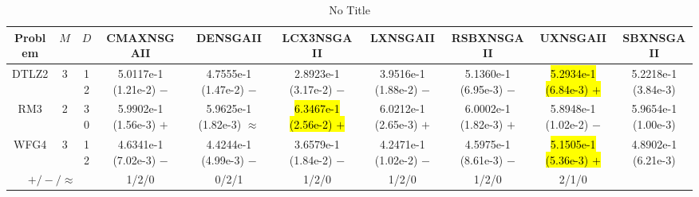 \documentclass[journal]{IEEEtran}
\begin{document}
\begin{table*}[htbp]
\renewcommand{\arraystretch}{1.2}
\centering
\caption{No Title}
\begin{tabular}{cccccccccc}
\toprule
Problem&$M$&$D$&CMAXNSGAII&DENSGAII&LCX3NSGAII&LXNSGAII&RSBXNSGAII&UXNSGAII&SBXNSGAII\\
\midrule
\multirow{1}{*}{DTLZ2}&3&12&5.0117e-1 (1.21e-2) $-$&4.7555e-1 (1.47e-2) $-$&2.8923e-1 (3.17e-2) $-$&3.9516e-1 (1.88e-2) $-$&5.1360e-1 (6.95e-3) $-$&\hl{5.2934e-1 (6.84e-3) $+$}&5.2218e-1 (3.84e-3)\\
\hline
\multirow{1}{*}{RM3}&2&30&5.9902e-1 (1.56e-3) $+$&5.9625e-1 (1.82e-3) $\approx$&\hl{6.3467e-1 (2.56e-2) $+$}&6.0212e-1 (2.65e-3) $+$&6.0002e-1 (1.82e-3) $+$&5.8948e-1 (1.02e-2) $-$&5.9654e-1 (1.00e-3)\\
\hline
\multirow{1}{*}{WFG4}&3&12&4.6341e-1 (7.02e-3) $-$&4.4244e-1 (4.99e-3) $-$&3.6579e-1 (1.84e-2) $-$&4.2471e-1 (1.02e-2) $-$&4.5975e-1 (8.61e-3) $-$&\hl{5.1505e-1 (5.36e-3) $+$}&4.8902e-1 (6.21e-3)\\
\hline
\multicolumn{3}{c}{$+/-/\approx$}&1/2/0&0/2/1&1/2/0&1/2/0&1/2/0&2/1/0&\\
\bottomrule
\end{tabular}
\label{No Label}
\end{table*}
\end{document}

